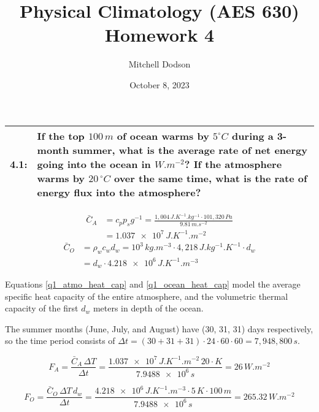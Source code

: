 \documentclass[12pt]{article}
\title{Physical Climatology (AES 630) Homework 4}
\author{Mitchell Dodson}
\date{October 8, 2023}
\newcommand*{\problem}[2]{
    \begin{table}[ht]
    \centering
        \begin{tabular}{ | p{.1\linewidth} p{.9\linewidth} | }
            \hline
            \vspace{.3em}\textbf{\large#1:} & \vspace{.3em}\small{#2}\hspace{.2em}\vspace{.5em} \\ \hline
        \end{tabular}
    \end{table}
}
\begin{document}
\maketitle


\problem{4.1}{
    If the top $100\,\si{m}$ of ocean warms by $5^\circ\si{C}$ during a 3-month summer, what is the average rate of net energy going into the ocean in $\si{W.m^{-2}}$?
    If the atmosphere warms by $20\,^\circ\si{C}$ over the same time, what is the rate of energy flux into the atmosphere?
    }%

\begin{equation}\label{q1_atmo_heat_cap}
    \begin{split}
        \bar{C}_A &= c_p p_s g^{-1} = \frac{1,004\,\si{J.K^{-1}.kg^{-1}}\cdot 101,320\,\si{Pa}}{9.81\,\si{m.s^{-2}}} \\
        &=\num{1.037e7}\,\si{J.K^{-1}.m^{-2}}
    \end{split}
\end{equation}
\begin{equation}\label{q1_ocean_heat_cap}
    \begin{split}
        \bar{C}_O &= \rho_w c_w d_w = 10^3\,\si{kg.m^{-3}} \cdot 4,218\,\si{J.kg^{-1}.K^{-1}} \cdot d_w \\
        &= d_w \cdot \num{4.218e6}\,\si{J.K^{-1}.m^{-3}}
    \end{split}
\end{equation}

Equations \ref{q1_atmo_heat_cap} and \ref{q1_ocean_heat_cap} model the average specific heat capacity of the entire atmosphere, and the volumetric thermal capacity of the first $d_w$ meters in depth of the ocean.

The summer months (June, July, and August) have (30, 31, 31) days respectively, so the time period consists of $\Delta t = (30+31+31)\cdot 24 \cdot 60 \cdot 60 = 7,948,800\,\si{s}$.

\begin{equation}\label{q1_atmo_rate}
    F_A = \frac{\bar{C}_A\,\Delta T}{\Delta t} = \frac{\num{1.037e7}\,\si{J.K^{-1}.m^{-2}}\,20\cdot\si{K}}{\num{7.9488e6}\,\si{s}} = 26\,\si{W.m^{-2}}
\end{equation}

\begin{equation}\label{q1_ocean_rate}
    F_O = \frac{\bar{C}_O\,\Delta T\,d_w}{\Delta t} = \frac{\num{4.218e6}\,\si{J.K^{-1}.m^{-3}}\cdot 5\,\si{K}\cdot 100\,\si{m}}{\num{7.9488e6}\,\si{s}} = 265.32\,\si{W.m^{-2}}
\end{equation}
\end{document}
